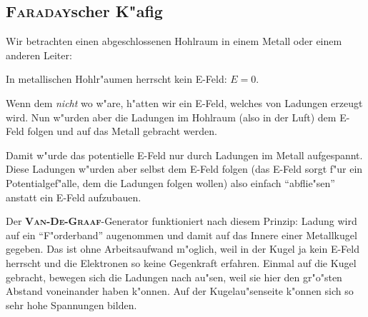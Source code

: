 






\subsection{\textsc{Faraday}scher K"afig}
\label{kap_faradayscher-kafig}

Wir betrachten einen abgeschlossenen Hohlraum in einem Metall oder
einem anderen Leiter:
\begin{Wichtig}
   In metallischen Hohlr"aumen herrscht kein E-Feld: $E = 0$.
\end{Wichtig}

Wenn dem \emph{nicht} wo w"are, h"atten wir ein E-Feld, welches von
Ladungen erzeugt wird. Nun w"urden aber die Ladungen im Hohlraum (also
in der Luft) dem E-Feld folgen und auf das Metall gebracht
werden.

Damit w"urde das potentielle E-Feld nur durch Ladungen im Metall
aufgespannt. Diese Ladungen w"urden aber selbst dem E-Feld folgen (das
E-Feld sorgt f"ur ein Potentialgef"alle, dem die Ladungen folgen wollen)
also einfach "`abflie"sen"' anstatt ein E-Feld aufzubauen.

\begin{Beispiel}
Der
\textbf{\textsc{Van-De-Graaf}}-Generator
funktioniert nach diesem Prinzip: Ladung wird auf ein "`F"orderband"'
augenommen und damit auf das Innere einer Metallkugel gegeben. Das ist
ohne Arbeitsaufwand m"oglich, weil in der Kugel ja kein E-Feld herrscht
und die Elektronen so keine Gegenkraft erfahren. Einmal auf die Kugel
gebracht, bewegen sich die Ladungen nach au"sen, weil sie hier den
gr"o"sten Abstand voneinander haben k"onnen. Auf der Kugelau"senseite
k"onnen sich so sehr hohe Spannungen bilden.
\end{Beispiel}






